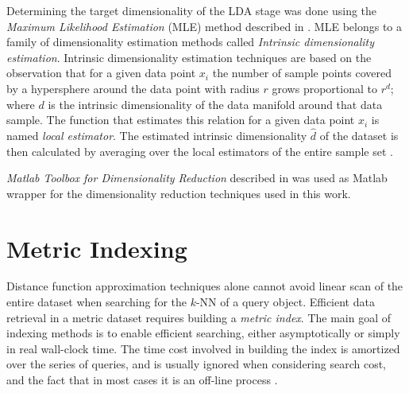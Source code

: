 \iftoggle{edit-mode}{\hspace{0pt}\marginpar{LDA target dimensionality}}{}
Determining the target dimensionality of the LDA stage was done using the \emph{Maximum Likelihood Estimation} (MLE) method described in \cite{levina2004maximum}.
MLE belongs to a family of dimensionality estimation methods called \emph{Intrinsic dimensionality estimation}.
Intrinsic dimensionality estimation techniques are based on the observation that for a given data point $x_i$ the number of sample points covered by a hypersphere around the data point with radius $r$ grows proportional to $r^d$; where $d$ is the intrinsic dimensionality of the data manifold around that data sample.  
The function that estimates this relation for a given data point $x_i$ is named \emph{local estimator}.
The estimated intrinsic dimensionality $\hat{d}$ of the dataset is then calculated by averaging over the local estimators of the entire sample set \cite{van2007introduction}.

\iftoggle{edit-mode}{\hspace{0pt}\marginpar{The DR package}}{}
\emph{Matlab Toolbox for Dimensionality Reduction} described in \cite{van2007introduction} was used as Matlab wrapper for the dimensionality reduction techniques used in this work.

\newpage{}


\section{Metric Indexing}
\label{sec:metric_indexing}

\iftoggle{edit-mode}{\hspace{0pt}\marginpar{Motivation}}{}
Distance function approximation techniques alone cannot avoid linear scan of the entire dataset when searching for the $k$-NN of a query object. 
Efficient data retrieval in a metric dataset requires building a \emph{metric index}.
The main goal of indexing methods is to enable efficient searching, either asymptotically or simply in real wall-clock time. 
The time cost involved in building the index is amortized over the series of queries, and is usually ignored when considering search cost, and the fact that in most cases it is an off-line process \cite{hetland2009basic}.

